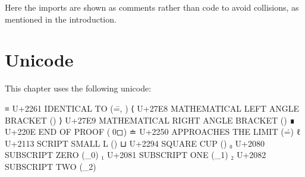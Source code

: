 Here the imports are shown as comments rather than code to avoid
collisions, as mentioned in the introduction.

\hypertarget{unicode}{%
\section{Unicode}\label{unicode}}

This chapter uses the following unicode:

\begin{myDisplay}
≡  U+2261  IDENTICAL TO (\==, \equiv)
⟨  U+27E8  MATHEMATICAL LEFT ANGLE BRACKET (\<)
⟩  U+27E9  MATHEMATICAL RIGHT ANGLE BRACKET (\>)
∎  U+220E  END OF PROOF (\qed)
≐  U+2250  APPROACHES THE LIMIT (\.=)
ℓ  U+2113  SCRIPT SMALL L (\ell)
⊔  U+2294  SQUARE CUP (\lub)
₀  U+2080  SUBSCRIPT ZERO (\_0)
₁  U+2081  SUBSCRIPT ONE (\_1)
₂  U+2082  SUBSCRIPT TWO (\_2)
\end{myDisplay}

